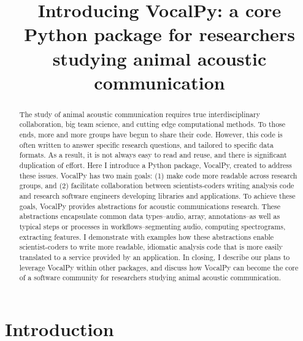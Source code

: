 \documentclass[11pt]{article}
\title{Introducing VocalPy: a core Python package for researchers studying animal acoustic communication}
\begin{document}
%
\maketitle
\begin{abstract}
The study of animal acoustic communication requires true interdisciplinary collaboration, big team science, and cutting edge computational methods. To those ends, more and more groups have begun to share their code. However, this code is often written to answer specific research questions, and tailored to specific data formats. As a result, it is not always easy to read and reuse, and there is significant duplication of effort. Here I introduce a Python package, VocalPy, created to address these issues. VocalPy has two main goals: (1) make code more readable across research groups, and (2) facilitate collaboration between scientists-coders writing analysis code and research software engineers developing libraries and applications. To achieve these goals, VocalPy provides abstractions for acoustic communications research. These abstractions encapsulate common data types--audio, array, annotations--as well as typical steps or processes in workflows--segmenting audio, computing spectrograms, extracting features. I demonstrate with examples how these abstractions enable scientist-coders to write more readable, idiomatic analysis code that is more easily translated to a service provided by an application. In closing, I describe our plans to leverage VocalPy within other packages, and discuss how VocalPy can become the core of a software community for researchers studying animal acoustic communication.
\end{abstract}
%

\section{Introduction}\label{sec:introduction}
\end{document}
